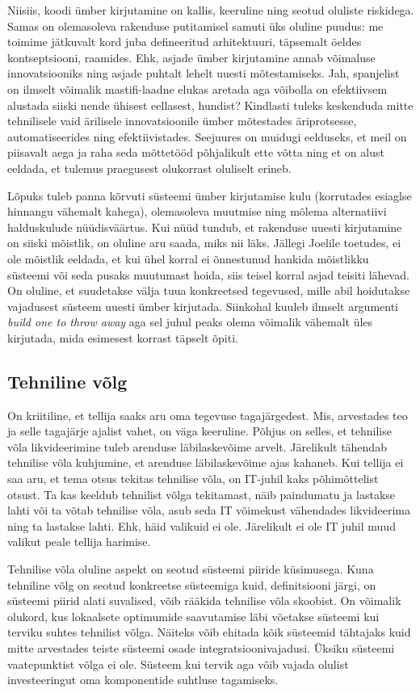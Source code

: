 \documentclass{article}
\begin{document}
Niisiis, koodi ümber kirjutamine on kallis, keeruline ning seotud oluliste riskidega. Samas on olemasoleva rakenduse putitamisel samuti üks oluline puudus: me toimime jätkuvalt kord juba defineeritud arhitektuuri, täpsemalt öeldes kontseptsiooni, raamides. Ehk, asjade ümber kirjutamine annab võimaluse innovatsiooniks ning asjade puhtalt lehelt uuesti mõtestamiseks. Jah, spanjelist on ilmselt võimalik mastifi-laadne elukas aretada aga võibolla on efektiivsem alustada siiski nende ühisest eellasest, hundist? Kindlasti tuleks keskenduda mitte tehnilisele vaid ärilisele innovatsioonile ümber mõtestades äriprotsesse, automatiseerides ning efektiivistades. Seejuures on muidugi eelduseks, et meil on piisavalt aega ja raha seda mõttetööd põhjalikult ette võtta ning et on alust eeldada, et tulemus praegusest olukorrast oluliselt erineb.

Lõpuks tuleb panna kõrvuti süsteemi ümber kirjutamise kulu (korrutades esiaglse hinnangu vähemalt kahega), olemasoleva muutmise ning mõlema alternatiivi halduskulude nüüdisväärtus. Kui nüüd tundub, et rakenduse uuesti kirjutamine on siiski mõistlik, on oluline aru saada, miks nii läks. Jällegi Joelile toetudes, ei ole mõistlik eeldada, et kui ühel korral ei õnnestunud hankida mõistlikku süsteemi või seda pusaks muutumast hoida, siis teisel korral asjad teisiti lähevad. On oluline, et suudetakse välja tuua konkreetsed tegevused, mille abil hoidutakse vajadusest süsteem uuesti ümber kirjutada. Siinkohal kuuleb ilmselt argumenti \emph{build one to throw away} aga sel juhul peaks olema võimalik vähemalt üles kirjutada, mida esimesest korrast täpselt õpiti.

\subsection{Tehniline võlg}
On kriitiline, et tellija saaks aru oma tegevuse tagajärgedest. Mis, arvestades teo ja selle tagajärje ajalist vahet, on väga keeruline. Põhjus on selles, et tehnilise võla likvideerimine tuleb arenduse läbilaskevõime arvelt. Järelikult tähendab tehnilise võla kuhjumine, et arenduse läbilaskevõime ajas kahaneb. Kui tellija ei saa aru, et tema otsus tekitas tehnilise võla, on IT-juhil kaks põhimõttelist otsust. Ta kas keeldub tehnilist võlga tekitamast, näib paindumatu ja lastakse lahti või ta võtab tehnilise võla, asub seda IT võimekust vähendades likvideerima ning ta lastakse lahti. Ehk, häid valikuid ei ole. Järelikult ei ole IT juhil muud valikut peale tellija harimise.

Tehnilise võla oluline aspekt on seotud süsteemi piiride küsimusega. Kuna tehniline võlg on seotud konkreetse süsteemiga kuid, definitsiooni järgi, on süsteemi piirid alati suvalised, võib rääkida tehnilise võla skoobist. On võimalik olukord, kus lokaalsete optimumide saavutamise läbi võetakse süsteemi kui terviku suhtes tehnilist võlga. Näiteks võib ehitada kõik süsteemid tähtajaks kuid mitte arvestades teiste süsteemi osade integratsioonivajadusi. Üksiku süsteemi vaatepunktist võlga ei ole. Süsteem kui tervik aga võib vajada olulist investeeringut oma komponentide suhtluse tagamiseks. 
\end{document}
